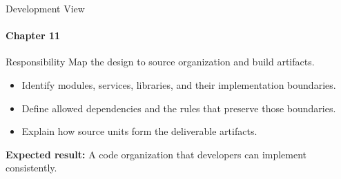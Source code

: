\begin{frame}{Development View}
\framesubtitle{Chapter 11}
\begin{block}{Responsibility}
Map the design to source organization and build artifacts.
\end{block}
\begin{itemize}
  \item Identify modules, services, libraries, and their implementation boundaries.
  \item Define allowed dependencies and the rules that preserve those boundaries.
  \item Explain how source units form the deliverable artifacts.
\end{itemize}
\vspace{0.15cm}
\textbf{Expected result:} A code organization that developers can implement consistently.
\end{frame}
